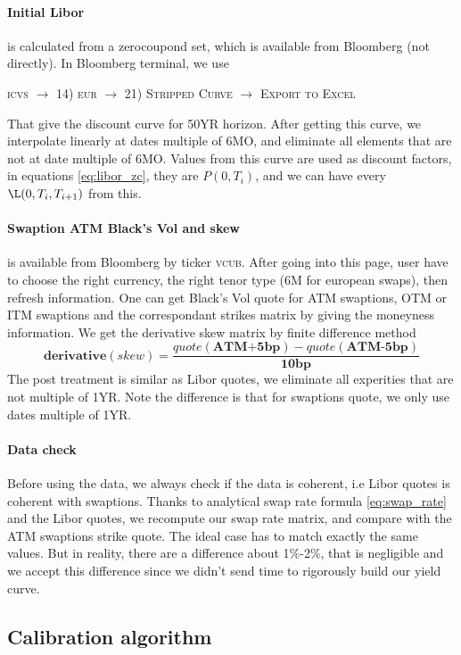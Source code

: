 \documentclass[a4paper,10pt]{article}
\newcommand{\bl}[1]{{\scshape  #1}}
\begin{document}
\paragraph{Initial Libor} is calculated from a zerocoupond set, which is available from Bloomberg (not directly). In Bloomberg terminal, we use 
\begin{center}
\bl{icvs} $\longrightarrow$ \bl{14) eur} $\longrightarrow$ \bl{21) Stripped Curve} $\longrightarrow$  \bl{Export to Excel} 
\end{center}
That give the discount curve for 50YR horizon. After getting this curve, we interpolate linearly at dates multiple of 6MO, and eliminate all elements that are not at date multiple of 6MO. Values from this curve are used as discount factors, in equations \ref{eq:libor_zc}, they are $P(0,T_{i})$, and we can have every $\L(0,T_{i},T_{i+1})$ from this. 
\paragraph{Swaption ATM Black's Vol and skew} is available from Bloomberg by ticker \bl{vcub}. After going into this page, user have to choose the right currency, the right tenor type (6M for european swaps), then refresh information. One can get Black's Vol quote for ATM swaptions, OTM or ITM swaptions and the correspondant strikes matrix by giving the moneyness information. We get the derivative skew matrix by finite difference method
\[
\textbf{derivative}(skew) = \frac{quote (\textbf{ATM+5bp}) - quote(\textbf{ATM-5bp}) }{\textbf{10bp}}
\]
The post treatment is similar as Libor quotes, we eliminate all experities that are not multiple of 1YR. Note the difference is that for swaptions quote, we only use dates multiple of 1YR. 
\paragraph{Data check}
Before using the data, we always check if the data is coherent, i.e Libor quotes is coherent with swaptions. Thanks to analytical swap rate formula \ref{eq:swap_rate} and the Libor quotes, we recompute our swap rate matrix, and compare with the ATM swaptions strike quote. The ideal case has to match exactly the same values. But in reality, there are a difference about 1\%-2\%, that is negligible and we accept this difference since we didn't send time to rigorously build our yield curve.    
\subsection{Calibration algorithm}
\end{document}
